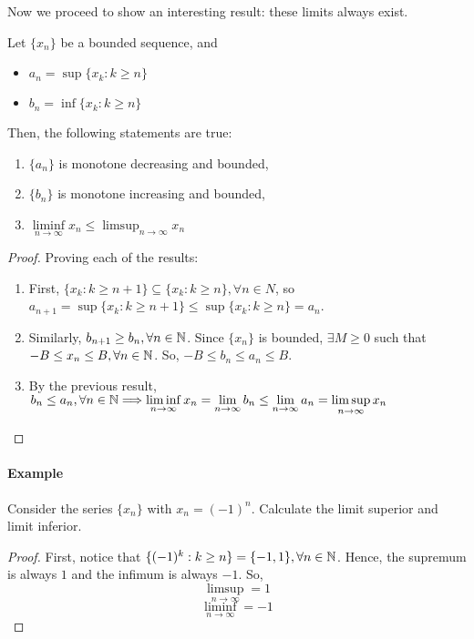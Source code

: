 Now we proceed to show an interesting result: these limits always exist.

\begin{theorem}
    Let $\{x_n\}$ be a bounded sequence, and
    \begin{itemize}
        \item $a_n = \sup\{x_k: k \geq n\}$
        \item $b_n = \inf\{x_k: k \geq n\}$
    \end{itemize}
    Then, the following statements are true:
    \begin{enumerate}
        \item $\{a_n\}$ is monotone decreasing and bounded,
        \item $\{b_n\}$ is monotone increasing and bounded,
        \item $\liminf \limits_{n\to \infty} x_n \leq \limsup_{n \to \infty} x_n$
    \end{enumerate}
\end{theorem}

\begin{proof}
    Proving each of the results:
    \begin{enumerate}
        \item First, $\{x_k:k \geq n+1\} \subseteq \{x_k: k \geq n\}, \forall n \in N$, so $a_{n+1} = \sup \{x_k: k \geq n+1\} \leq \sup \{x_k: k \geq n\} = a_n$.
        \item Similarly, $b_{n+1} \geq b_n, \forall n \in \mathbb{N}$. Since $\{x_n\}$ is bounded, $\exists M \geq 0$ such that $-B \leq x_n \leq B, \forall n \in \mathbb{N}$. So, $-B \leq b_n \leq a_n \leq B$.
        \item By the previous result, $b_n \leq a_n, \forall n \in \mathbb{N} \Longrightarrow \liminf \limits_{n \to \infty} x_n = \lim \limits_{n \to \infty} b_n \leq \lim \limits_{n \to \infty} a_n = \limsup \limits_{n \to \infty} x_n$
    \end{enumerate}
\end{proof}

\paragraph{Example} Consider the series $\{x_n\}$ with $x_n=(-1)^n$. Calculate the limit superior and limit inferior.

\begin{proof}
    First, notice that $\{ (-1)^k: k \geq n\} = \{-1, 1\}, \forall n \in \mathbb{N}$. Hence, the supremum is always $1$ and the infimum is always $-1$. So,
    \begin{equation*}
        \limsup \limits_{n \to \infty} = 1
    \end{equation*}
    \begin{equation*}
        \liminf \limits_{n \to \infty} = -1
    \end{equation*}
\end{proof}

